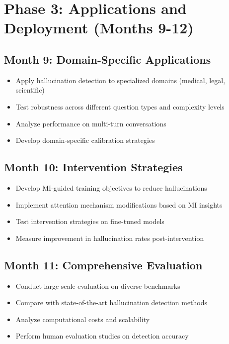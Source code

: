 \documentclass[11pt, oneside]{book}
\theoremstyle{plain}
\theoremstyle{definition}
\theoremstyle{remark}
\begin{document}
\section{Phase 3: Applications and Deployment (Months 9-12)}

\subsection{Month 9: Domain-Specific Applications}
\begin{itemize}
    \item Apply hallucination detection to specialized domains (medical, legal, scientific)
    \item Test robustness across different question types and complexity levels
    \item Analyze performance on multi-turn conversations
    \item Develop domain-specific calibration strategies
\end{itemize}

\subsection{Month 10: Intervention Strategies}
\begin{itemize}
    \item Develop MI-guided training objectives to reduce hallucinations
    \item Implement attention mechanism modifications based on MI insights
    \item Test intervention strategies on fine-tuned models
    \item Measure improvement in hallucination rates post-intervention
\end{itemize}

\subsection{Month 11: Comprehensive Evaluation}
\begin{itemize}
    \item Conduct large-scale evaluation on diverse benchmarks
    \item Compare with state-of-the-art hallucination detection methods
    \item Analyze computational costs and scalability
    \item Perform human evaluation studies on detection accuracy
\end{itemize}
\end{document}
